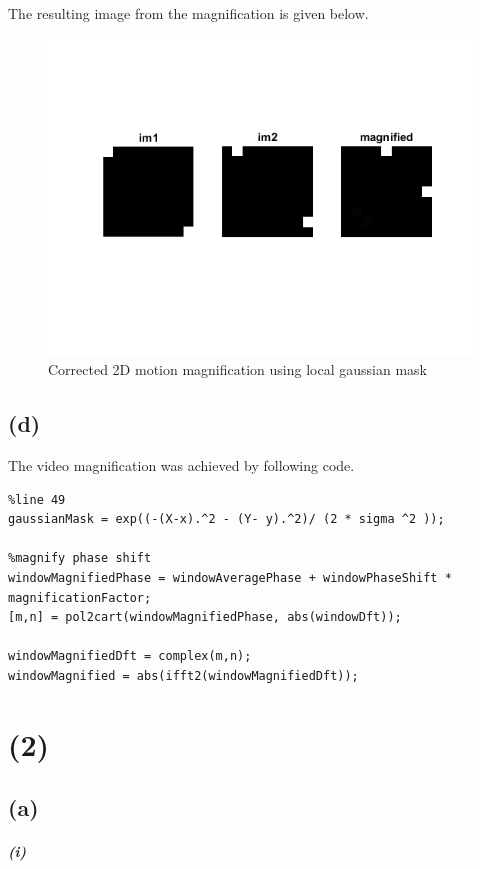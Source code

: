 \documentclass[12pt,letterpaper]{article}
\begin{document}
The resulting image from the magnification is given below.
\begin{figure}[htbp]
\includegraphics{partc.png}
\caption{Corrected 2D motion magnification using local gaussian mask}
\end{figure}

\subsection*{(d)}
The video magnification was achieved by following code. 
\begin{lstlisting}
%line 49 
gaussianMask = exp((-(X-x).^2 - (Y- y).^2)/ (2 * sigma ^2 ));

%magnify phase shift
windowMagnifiedPhase = windowAveragePhase + windowPhaseShift * magnificationFactor;
[m,n] = pol2cart(windowMagnifiedPhase, abs(windowDft));

windowMagnifiedDft = complex(m,n);
windowMagnified = abs(ifft2(windowMagnifiedDft));

\end{lstlisting}

\section*{(2)}
\subsection*{(a)}
\subparagraph*{(i)}
\end{document}
